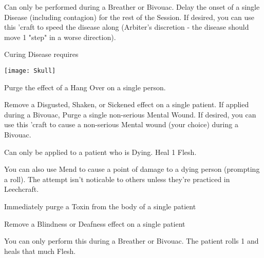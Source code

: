 {  \LEECHCRAFT[
    Name=Delay Infection,
    Link=leechcraft-delay-infection,
    Target=7,
    Keywords=None,
    Reversible=Y 
  ]
  
  Can only be performed during a Breather or Bivouac.  Delay the onset of a single Disease (including contagion) for the rest of the Session.  If desired, you can use this 'craft to speed the disease along (Arbiter's discretion - the disease should move 1 "step" in a worse direction).

  Curing Disease requires 

  \begin{center}
  \texttt{[image: Skull]}
  \end{center}


  \LEECHCRAFT[
    Name=Hair of the Dog,
    Link=leechcraft-hair-of-the-dog,
    Target=2,
    Keywords=Purge,
    Reversible=N
  ]

  Purge the effect of a Hang Over on a single person.

  \LEECHCRAFT[
    Name=Laudanum,
    Link=leechcraft-laudanum,
    Target=9,
    Keywords=Purge,
    Reversible=Y 
  ]

  Remove a Disgusted, Shaken, or Sickened effect on a single patient.  If applied during a Bivouac, Purge a single non-serious Mental Wound.   If desired, you can use this 'craft to cause a non-serious Mental wound (your choice) during a Bivouac.

  \LEECHCRAFT[
    Name=Mend,
    Link=leechcraft-mend,
    Target=2,
    Keywords=None,
    Reversible=Y
  ]

  Can only be applied to a patient who is Dying. Heal 1 Flesh.  

  You can also use Mend to cause a point of damage to a dying person (prompting a \DEATH roll).  The attempt isn't noticable to others unless they're practiced in Leechcraft.

  \LEECHCRAFT[
    Name=Purge Toxin,
    Link=leechcraft-purge-toxin,
    Target=6,
    Keywords=None,
    Reversible=N 
  ]

  Immediately purge a Toxin from the body of a single patient

  \LEECHCRAFT[
    Name=Restore Senses,
    Link=leechcraft-restore-senses,
    Target=6,
    Keywords=None,
    Reversible=N 
  ]
  Remove a Blindness or Deafness effect on a single patient

  \LEECHCRAFT[
    Name=Sew Wounds,
    Link=leechcraft-sew-wounds,
    Target=4,
    Keywords=None,
    Reversible=N
  ]
  You can only perform this during a Breather or Bivouac. The patient rolls 1 \FLESH and heals that much Flesh.

}
